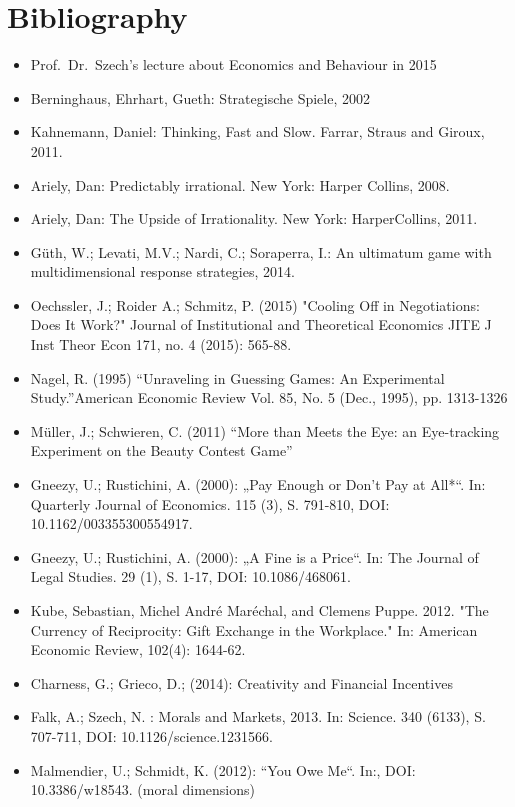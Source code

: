 

\chapter*{Bibliography}
\begin{multicols}{2}
\begin{itemize}
	\item Prof.~Dr.~Szech's lecture about Economics and Behaviour in 2015
	\item Berninghaus, Ehrhart, Gueth: Strategische Spiele, 2002
	\item Kahnemann, Daniel: Thinking, Fast and Slow. Farrar, Straus and Giroux, 2011.
	\item Ariely, Dan: Predictably irrational. New York: Harper Collins, 2008.
	\item Ariely, Dan: The Upside of Irrationality. New York: HarperCollins, 2011. 
	\item Güth, W.; Levati, M.V.; Nardi, C.; Soraperra, I.: An ultimatum game with multidimensional response strategies, 2014.
	\item Oechssler, J.; Roider A.; Schmitz, P. (2015) "Cooling Off in Negotiations: Does It Work?" Journal of Institutional and Theoretical Economics JITE J Inst Theor Econ 171, no. 4 (2015): 565-88. 
	\item Nagel, R. (1995) “Unraveling in Guessing Games: An Experimental Study.”American Economic Review Vol. 85, No. 5 (Dec., 1995), pp. 1313-1326
	\item Müller, J.; Schwieren, C. (2011) “More than Meets the Eye: an Eye-tracking Experiment on the Beauty Contest Game”
	\item Gneezy, U.; Rustichini, A. (2000): „Pay Enough or Don't Pay at All*“. In: Quarterly Journal of Economics. 115 (3), S. 791-810, DOI: 10.1162/003355300554917.
	\item Gneezy, U.; Rustichini, A. (2000): „A Fine is a Price“. In: The Journal of Legal Studies. 29 (1), S. 1-17, DOI: 10.1086/468061.
	\item Kube, Sebastian, Michel André Maréchal, and Clemens Puppe. 2012. "The Currency of Reciprocity: Gift Exchange in the Workplace." In: American Economic Review, 102(4): 1644-62.
	\item Charness, G.; Grieco, D.; (2014): Creativity and Financial Incentives
	\item Falk, A.; Szech, N. : Morals and Markets, 2013. In: Science. 340 (6133), S. 707-711, DOI: 10.1126/science.1231566.
	\item Malmendier, U.; Schmidt, K. (2012): “You Owe Me“. In:, DOI: 10.3386/w18543. (moral dimensions)

\end{itemize}
\end{multicols}
